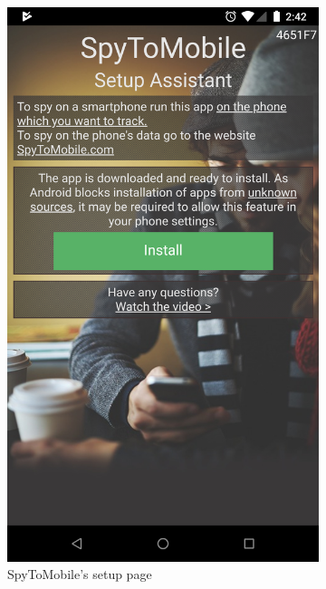 \documentclass[acmtog]{acmart}
\begin{document}
\begin{figure}
	\centering
	\begin{subfigure}{0.5\columnwidth}
		\centering
		\includegraphics[width=0.9\linewidth]{../images/CellPhoneTracker.png}
		\caption{SpyToMobile's setup page }
		\label{fig:sub1}
	\end{subfigure}%
	\begin{subfigure}{0.5\columnwidth}
		\centering

\end{subfigure}
\end{figure}
\end{document}
